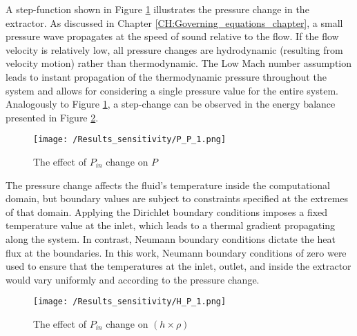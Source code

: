 \documentclass[../Article_Sensitivity_Analsysis.tex]{subfiles}
\begin{document}
	
	
	A step-function shown in Figure \ref{fig:Sensitivty_P_P} illustrates the pressure change in the extractor. As discussed in Chapter \ref{CH:Governing_equations_chapter}, a small pressure wave propagates at the speed of sound relative to the flow. If the flow velocity is relatively low, all pressure changes are hydrodynamic (resulting from velocity motion) rather than thermodynamic. The Low Mach number assumption leads to instant propagation of the thermodynamic pressure throughout the system and allows for considering a single pressure value for the entire system. Analogously to Figure \ref{fig:Sensitivty_P_P}, a step-change can be observed in the energy balance presented in Figure \ref{fig:Sensitivty_P_H}.
	
	\begin{figure}[h!]
		\centering
		\texttt{[image: /Results\_sensitivity/P\_P\_1.png]}
		\caption{The effect of $P_{in}$ change on $P$}
		\label{fig:Sensitivty_P_P}
	\end{figure}
	
	The pressure change affects the fluid's temperature inside the computational domain, but boundary values are subject to constraints specified at the extremes of that domain. Applying the Dirichlet boundary conditions imposes a fixed temperature value at the inlet, which leads to a thermal gradient propagating along the system. In contrast, Neumann boundary conditions dictate the heat flux at the boundaries. In this work, Neumann boundary conditions of zero were used to ensure that the temperatures at the inlet, outlet, and inside the extractor would vary uniformly and according to the pressure change.
	
	\begin{figure}[h!]
		\centering
		\texttt{[image: /Results\_sensitivity/H\_P\_1.png]}
		\caption{The effect of $P_{in}$ change on $(h \times \rho)$}
		\label{fig:Sensitivty_P_H}
	\end{figure}
	
\end{document}
